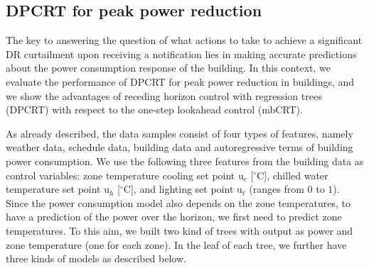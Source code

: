 \subsection{DPCRT for peak power reduction}

The key to answering the question of what actions to take to achieve a significant DR curtailment upon receiving a notification lies in making accurate predictions about the power consumption response of the building. 
In this context, we evaluate the performance of DPCRT for peak power reduction in buildings, and we show the advantages of receding horizon control with regression trees (DPCRT) with respect to the one-step lookahead control (mbCRT). 

As already described, the data samples consist of four types of features, namely weather data, schedule data, building data and autoregressive terms of building power consumption. 
We use the following three features from the building data as control variables: zone temperature cooling set point $\mathrm{u}_c$ [$^{\circ}$C], chilled water temperature set point $\mathrm{u}_h$ [$^{\circ}$C], and lighting set point $\mathrm{u}_\ell$ (ranges from $0$ to $1$). Since the power consumption model also depends on the zone temperatures, to have a prediction of the power over the horizon, we first need to predict zone temperatures. To this aim, we built two kind of trees with output as power and zone temperature (one for each zone). In the leaf of each tree, we further have three kinds of models as described below.
